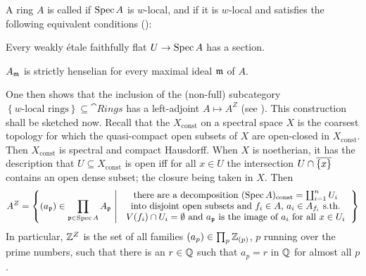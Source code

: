 A ring $A$ is called  if $\operatorname{Spec} A$ is $w$-local, and  if it is $w$-local and satisfies the following equivalent conditions (\cite[Definition~2.2.1 and Lemma~2.2.9]{proetale}):
\begin{numerate}
	\item Every weakly étale faithfully flat $U\morphism \Spec A$ has a section.
	\item $A_{\mathfrak{m}}$ is strictly henselian for every maximal ideal $\mathfrak{m}$ of $A$.
\end{numerate}
One then shows that the inclusion of the (non-full) subcategory $\left\{w\text{-local rings}\right\}\subseteq\cat{Rings}$ has a left-adjoint $A\mapsto A^Z$ (see \cite[Lemma~2.2.4]{proetale}). This construction shall be sketched now. Recall that the  $X_\mathrm{const}$ on a spectral space $X$ is the coarsest topology for which the quasi-compact open subsets of $X$ are open-closed in $X_\mathrm{const}$. Then $X_\mathrm{const}$ is spectral and compact Hausdorff. When $X$ is noetherian, it has the description that $U\subseteq X_\mathrm{const}$ is open iff for all $x\in U$ the intersection $U\cap \ov{\{x\}}$ contains an open dense subset; the closure being taken in $X$. Then
\begin{equation*}
	A^Z=\left\{(a_\pp)\in\prod_{\pp\in\Spec A}A_\pp\st \begin{tabular}{c}
	there are a decomposition $(\Spec A)_\mathrm{const}=\coprod_{i=1}^nU_i$\\
	into disjoint open subsets and $f_i\in A$, $a_i\in A_{f_i}$ s.th.\\
	$V(f_i)\cap U_i=\emptyset$ and $a_\pp$ is the image of $a_i$ for all $x\in U_i$
	\end{tabular}\right\}
\end{equation*}
In particular, $\mathbb{Z}^Z$ is the set of all families $(a_p)\in\prod_p\mathbb{Z}_{(p)}$, $p$ running over the prime numbers, such that there is an $r\in \mathbb{Q}$ such that $a_p=r$ in $\mathbb{Q}$ for almost all $p$.